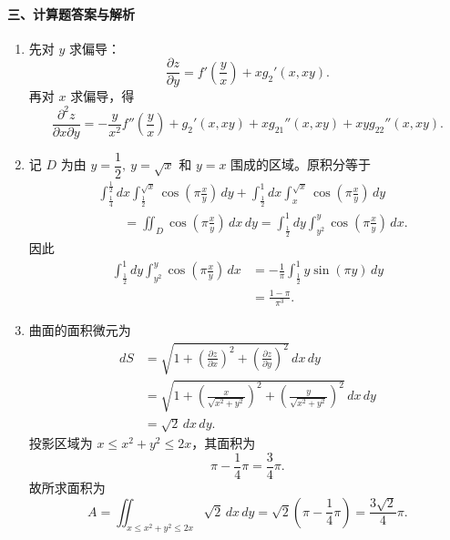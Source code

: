 \paragraph*{三、计算题答案与解析}
\begin{enumerate}
  \item 先对 $y$ 求偏导：
  \[
    \frac{\partial z}{\partial y}
    =f'\left(\frac{y}{x}\right)+xg_2'(x,xy).
  \]
  再对 $x$ 求偏导，得
  \[
    \frac{\partial^2z}{\partial x\partial y}
    =
    -\frac{y}{x^2}f''\left(\frac{y}{x}\right)
    +g_2'(x,xy)+xg_{21}''(x,xy)+xyg_{22}''(x,xy).
  \]

  \item 记 $D$ 为由 $y=\dfrac12,\ y=\sqrt{x}$ 和 $y=x$ 围成的区域。原积分等于
  \begin{align*}
    &\int_{\frac14}^{\frac12}dx\int_{\frac12}^{\sqrt{x}}\cos\left(\pi\frac{x}{y}\right)\,dy
    +\int_{\frac12}^{1}dx\int_x^{\sqrt{x}}\cos\left(\pi\frac{x}{y}\right)\,dy\\
    &\qquad
    =\iint_D\cos\left(\pi\frac{x}{y}\right)\,dx\,dy
    =\int_{\frac12}^{1}dy\int_{y^2}^{y}\cos\left(\pi\frac{x}{y}\right)\,dx.
  \end{align*}
  因此
  \begin{align*}
    \int_{\frac12}^{1}dy\int_{y^2}^{y}\cos\left(\pi\frac{x}{y}\right)\,dx
    &=-\frac1\pi\int_{\frac12}^{1}y\sin(\pi y)\,dy\\
    &=\frac{1-\pi}{\pi^3}.
  \end{align*}

  \item 曲面的面积微元为
  \begin{align*}
    dS
    &=\sqrt{1+\left(\frac{\partial z}{\partial x}\right)^2+\left(\frac{\partial z}{\partial y}\right)^2}\,dx\,dy\\
    &=\sqrt{1+\left(\frac{x}{\sqrt{x^2+y^2}}\right)^2+\left(\frac{y}{\sqrt{x^2+y^2}}\right)^2}\,dx\,dy\\
    &=\sqrt2\,dx\,dy.
  \end{align*}
  投影区域为 $x\le x^2+y^2\le 2x$，其面积为
  \[
    \pi-\frac14\pi=\frac34\pi.
  \]
  故所求面积为
  \[
    A=\iint_{x\le x^2+y^2\le 2x}\sqrt2\,dx\,dy
    =\sqrt2\left(\pi-\frac14\pi\right)
    =\frac{3\sqrt2}{4}\pi.
  \]
\end{enumerate}

